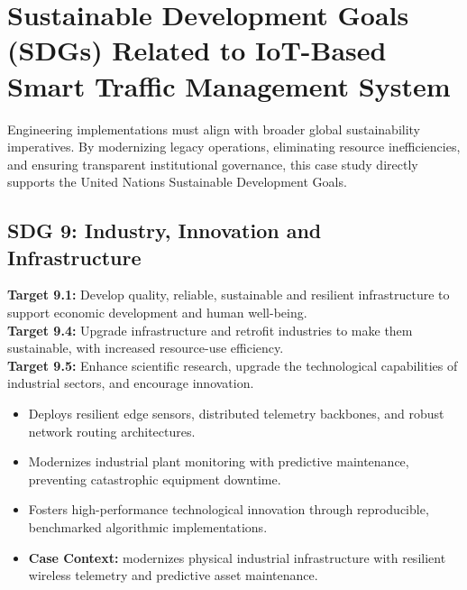 \section{Sustainable Development Goals (SDGs) Related to IoT-Based Smart Traffic Management System}
Engineering implementations must align with broader global sustainability imperatives. By modernizing legacy operations, eliminating resource inefficiencies, and ensuring transparent institutional governance, this case study directly supports the United Nations Sustainable Development Goals.

\subsection{SDG 9: Industry, Innovation and Infrastructure}
\noindent\textbf{Target 9.1:} Develop quality, reliable, sustainable and resilient infrastructure to support economic development and human well-being. \\
\noindent\textbf{Target 9.4:} Upgrade infrastructure and retrofit industries to make them sustainable, with increased resource-use efficiency. \\
\noindent\textbf{Target 9.5:} Enhance scientific research, upgrade the technological capabilities of industrial sectors, and encourage innovation.
\begin{itemize}
  \item Deploys resilient edge sensors, distributed telemetry backbones, and robust network routing architectures.
  \item Modernizes industrial plant monitoring with predictive maintenance, preventing catastrophic equipment downtime.
  \item Fosters high-performance technological innovation through reproducible, benchmarked algorithmic implementations.
  \item \textbf{Case Context:} modernizes physical industrial infrastructure with resilient wireless telemetry and predictive asset maintenance.
\end{itemize}

